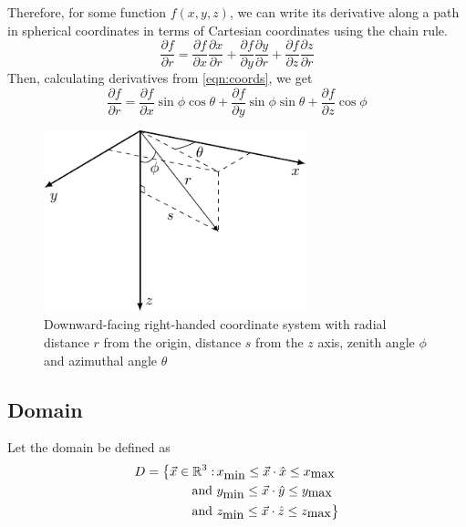 Therefore, for some function $f(x,y,z)$, we can write its derivative along a path in spherical coordinates in terms of Cartesian coordinates using the chain rule.
\begin{equation}
	\frac{\partial f}{\partial r} 
	=\frac{\partial f}{\partial x}\frac{\partial x}{\partial r} 
	+ \frac{\partial f}{\partial y}\frac{\partial y}{\partial r} 
	+ \frac{\partial f}{\partial z}\frac{\partial z}{\partial r}
\end{equation}
Then, calculating derivatives from \eqref{eqn:coords}, we get
\begin{equation}
	\frac{\partial f}{\partial r} 
	=\frac{\partial f}{\partial x}\sin\phi\cos\theta
	+ \frac{\partial f}{\partial y}\sin\phi\sin\theta
	+ \frac{\partial f}{\partial z}\cos\phi
	\label{eqn:partials}
\end{equation}
\begin{figure}[H]
	\centering
	\includegraphics[width=3in]{3d_coords}
	\caption{Downward-facing right-handed coordinate system with radial distance $r$ from the origin, distance $s$ from the $z$ axis, zenith angle $\phi$ and azimuthal angle $\theta$}
	\label{fig:3dcoords}
\end{figure}

\subsection{Domain}

Let the domain be defined as
\begin{equation}
  \begin{split}
    D = \big\{
    \vec{x} \in \mathbb{R}^3 :\, &x_{\mbox{min}} \leq \vec{x} \cdot \hat{x} \leq x_{\mbox{max}} \\
    \mbox{ and } &y_{\mbox{min}} \leq \vec{x} \cdot \hat{y} \leq y_{\mbox{max}} \\
    \mbox{ and } &z_{\mbox{min}} \leq \vec{x} \cdot \hat{z} \leq z_{\mbox{max}}
    \big\}
  \end{split}
\end{equation}


